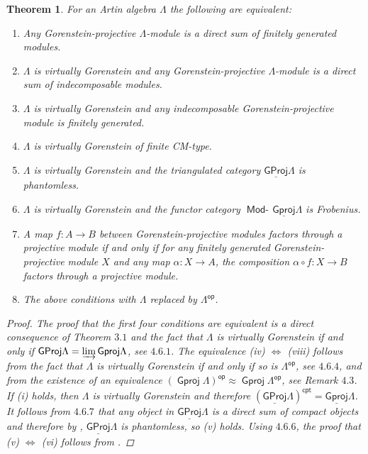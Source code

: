 \documentclass[oneside, a4paper,reqno]{amsart}
\numberwithin{equation}{section}
\newtheorem{thm}{Theorem}[section]
\theoremstyle{definition}
\begin{document}
\begin{thm} For an Artin algebra $\Lambda$ the following are
equivalent:
\begin{enumerate}
\item Any Gorenstein-projective $\Lambda$-module is a direct sum of finitely
generated modules.
\item $\Lambda$ is virtually Gorenstein and any Gorenstein-projective
$\Lambda$-module is a direct sum of indecomposable modules.
\item $\Lambda$ is virtually Gorenstein and any indecomposable Gorenstein-projective module is finitely generated.
\item $\Lambda$ is virtually Gorenstein of finite CM-type.
\item $\Lambda$ is virtually Gorenstein and the triangulated category
${\operatorname{\underline{\mathsf{GProj}}}\nolimits}\Lambda$ is phantomless.
\item $\Lambda$ is virtually Gorenstein and the functor category $\operatorname*{\mathsf{Mod}-\!}{\operatorname{\underline{\mathsf{Gproj}}}\nolimits}\Lambda$ is Frobenius.
\item A map  $f \colon A {\longrightarrow} B$ between Gorenstein-projective
modules factors through a projective module if and only if for any
finitely generated Gorenstein-projective module $X$ and any map
$\alpha : X {\longrightarrow} A$, the composition $\alpha \circ f \colon X {\longrightarrow}
B$ factors through a projective module.
\item The above conditions with $\Lambda$ replaced by
$\Lambda^\operatorname*{\mathsf{op}}$.
\end{enumerate}
\begin{proof} The proof that the first four conditions are equivalent is a direct consequence of Theorem $3.1$ and the
fact that $\Lambda$ is virtually Gorenstein if and only if
${\operatorname{\mathsf{GProj}}\nolimits}\Lambda = \operatorname*{\varinjlim}{\operatorname{\mathsf{Gproj}}\nolimits}\Lambda$, see $4.6.1$. The equivalence
(iv) $\Leftrightarrow$ (viii) follows from the fact that $\Lambda$
is virtually Gorenstein if and only if so is $\Lambda^\operatorname*{\mathsf{op}}$, see
$4.6.4$, and from the existence of an  equivalence
$({\operatorname{\mathsf{Gproj}}\nolimits}\Lambda)^\operatorname*{\mathsf{op}} \approx {\operatorname{\mathsf{Gproj}}\nolimits}\Lambda^\operatorname*{\mathsf{op}}$, see Remark
$4.3$. If (i) holds, then $\Lambda$ is virtually Gorenstein and
therefore $({\operatorname{\underline{\mathsf{GProj}}}\nolimits}\Lambda)^{\mathsf{cpt}} = {\operatorname{\underline{\mathsf{Gproj}}}\nolimits}\Lambda$. It follows
from $4.6.7$ that any object in ${\operatorname{\underline{\mathsf{GProj}}}\nolimits}\Lambda$ is a direct sum of compact
objects and therefore by  \cite[Theorem 9.3]{B:3cats},
${\operatorname{\underline{\mathsf{GProj}}}\nolimits}\Lambda$ is phantomless, so (v) holds. Using  $4.6.6$, the
proof that (v) $\Leftrightarrow$ (vi) follows from \cite[Proposition
9.2, Theorem 9.3]{B:3cats}. 


\end{proof}
\end{thm}
\end{document}
